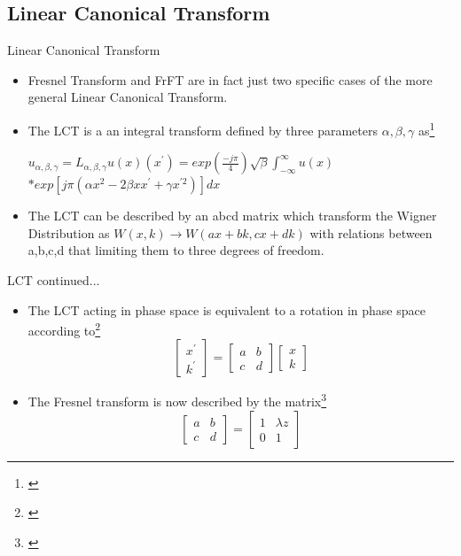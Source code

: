 \documentclass{beamer}
\begin{document}
\subsection{Linear Canonical Transform}
\begin{frame}{Linear Canonical Transform}
\begin{itemize}
	\item Fresnel Transform and FrFT are in fact just two specific cases of the more general Linear Canonical Transform. 
	\item The LCT is a an integral transform defined by three parameters $\alpha, \beta, \gamma$ as\footnote{\cite{Hennelly05}}
	\begin{center}
	$u_{\alpha, \beta, \gamma} = L_{\alpha, \beta, \gamma}{u(x)}(x^{'}) = exp(\frac{-j\pi}{4})\sqrt{\beta}\int_{-\infty}^{\infty}u(x)$
	$*exp[j\pi(\alpha x^{2} - 2\beta xx^{'} + \gamma x^{'2})]dx$
	\end{center}
	\item The LCT can be described by an abcd matrix which transform the Wigner Distribution as 
	$W(x,k) \rightarrow W(ax+bk,cx+dk)$ with relations between a,b,c,d that limiting them to three degrees of freedom. 
\end{itemize}
\end{frame}


\begin{frame}{LCT continued...}
\begin{itemize}
	\item The LCT acting in phase space is equivalent to a rotation in phase space according to\footnote{\cite{Hennelly05}}
	 \[
	\begin{bmatrix}
	x^{'}\\
	k^{'}
	\end{bmatrix} = 
	\begin{bmatrix}
	a & b \\
	c & d
	\end{bmatrix}
	\begin{bmatrix}
	x\\
	k
	\end{bmatrix}
	\]   
	\item The Fresnel transform is now described by the matrix\footnote{\cite{Hennelly05}}
	\[
	\begin{bmatrix}
		a & b \\
		c & d
	\end{bmatrix}
	=
	\begin{bmatrix}
	1 & \lambda z \\
	0 & 1
	\end{bmatrix}		
	\]
\end{itemize}
\end{frame}
\end{document}
